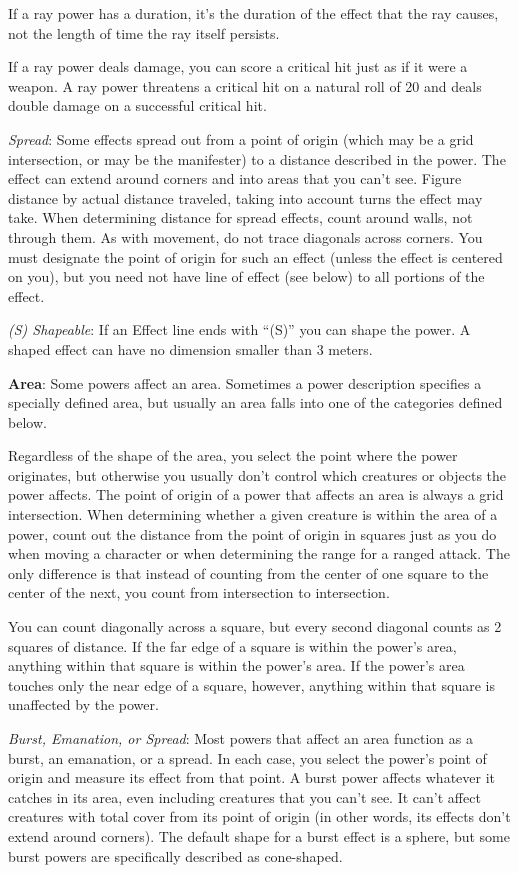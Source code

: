 If a ray power has a duration, it's the duration of the effect that the ray causes, not the length of time the ray itself persists.

If a ray power deals damage, you can score a critical hit just as if it were a weapon. A ray power threatens a critical hit on a natural roll of 20 and deals double damage on a successful critical hit.

\textit{Spread}: Some effects spread out from a point of origin (which may be a grid intersection, or may be the manifester) to a distance described in the power. The effect can extend around corners and into areas that you can't see. Figure distance by actual distance traveled, taking into account turns the effect may take. When determining distance for spread effects, count around walls, not through them. As with movement, do not trace diagonals across corners. You must designate the point of origin for such an effect (unless the effect is centered on you), but you need not have line of effect (see below) to all portions of the effect.

\textit{(S) Shapeable}: If an Effect line ends with ``(S)'' you can shape the power. A shaped effect can have no dimension smaller than 3 meters.

\textbf{Area}: Some powers affect an area. Sometimes a power description specifies a specially defined area, but usually an area falls into one of the categories defined below.

Regardless of the shape of the area, you select the point where the power originates, but otherwise you usually don't control which creatures or objects the power affects. The point of origin of a power that affects an area is always a grid intersection. When determining whether a given creature is within the area of a power, count out the distance from the point of origin in squares just as you do when moving a character or when determining the range for a ranged attack. The only difference is that instead of counting from the center of one square to the center of the next, you count from intersection to intersection.

You can count diagonally across a square, but every second diagonal counts as 2 squares of distance. If the far edge of a square is within the power's area, anything within that square is within the power's area. If the power's area touches only the near edge of a square, however, anything within that square is unaffected by the power.

\textit{Burst, Emanation, or Spread}: Most powers that affect an area function as a burst, an emanation, or a spread. In each case, you select the power's point of origin and measure its effect from that point. A burst power affects whatever it catches in its area, even including creatures that you can't see. It can't affect creatures with total cover from its point of origin (in other words, its effects don't extend around corners). The default shape for a burst effect is a sphere, but some burst powers are specifically described as cone-shaped.


